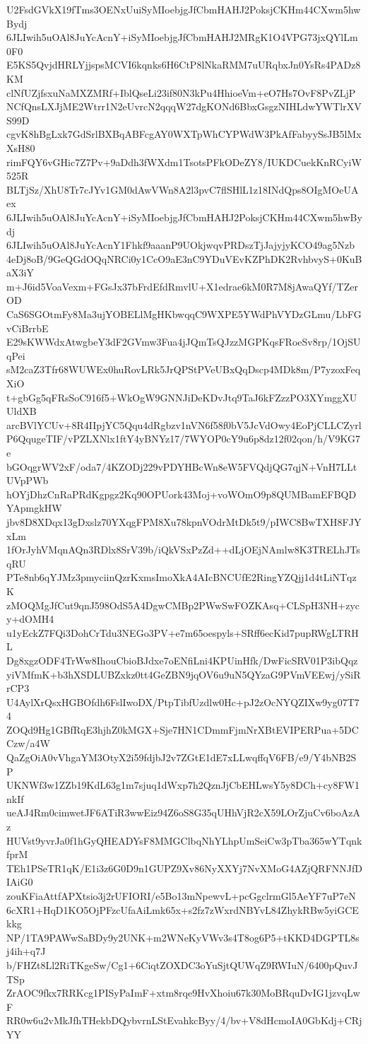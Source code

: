 U2FsdGVkX19fTms3OENxUuiSyMIoebjgJfCbmHAHJ2PoksjCKHm44CXwm5hwBydj
6JLIwih5uOAl8JuYcAcnY+iSyMIoebjgJfCbmHAHJ2MRgK1O4VPG73jxQYlLm0F0
E5KS5QvjdHRLYjjspsMCVI6kqnks6H6CtP8lNkaRMM7uURqbxJn0YsRs4PADz8KM
clNfUZjfsxuNaMXZMRf+IblQseLi23if80N3kPu4HhioeVm+eO7Hs7OvF8PvZLjP
NCfQnsLXJjME2Wtrr1N2eUvrcN2qqqW27dgKONd6BbxGsgzNIHLdwYWTlrXVS99D
cgvK8hBgLxk7GdSrlBXBqABFcgAY0WXTpWhCYPWdW3PkAfFabyySsJB5lMxXsH80
rimFQY6vGHic7Z7Pv+9aDdh3fWXdm1TsotsPFkODeZY8/IUKDCuekKnRCyiW525R
BLTjSz/XhU8Tr7cJYv1GM0dAwVWn8A2l3pvC7flSHlL1z18INdQps8OIgMOeUAex
6JLIwih5uOAl8JuYcAcnY+iSyMIoebjgJfCbmHAHJ2PoksjCKHm44CXwm5hwBydj
6JLIwih5uOAl8JuYcAcnY1Fhkf9aaanP9UOkjwqvPRDszTjJajyjyKCO49ag5Nzb
4eDj8oB/9GeQGdOQqNRCi0y1CcO9aE3nC9YDuVEvKZPhDK2RvhbvyS+0KuBaX3iY
m+J6id5VoaVexm+FGsJx37bFrdEfdRmvlU+X1edrae6kM0R7M8jAwaQYf/TZerOD
CaS6SGOtmFy8Ma3ujYOBELlMgHKbwqqC9WXPE5YWdPhVYDzGLmu/LbFGvCiBrrbE
E29sKWWdxAtwgbeY3dF2GVmw3Fua4jJQmTsQJzzMGPKqsFRoeSv8rp/1OjSUqPei
sM2caZ3Tfr68WUWEx0huRovLRk5JrQPStPVeUBxQqDscp4MDk8m/P7yzoxFeqXiO
t+gbGg5qFRsSoC916f5+WkOgW9GNNJiDeKDvJtq9TaJ6kFZzzPO3XYmggXUUldXB
arcBVlYCUv+8R4IIpjYC5Qqu4dRgbzv1nVN6f58f0bV5JcVdOwy4EoPjCLLCZyrl
P6QqugeTIF/vPZLXNlx1ftY4yBNYz17/7WYOP0cY9u6p8dz12f02qon/h/V9KG7e
bGOqgrWV2xF/oda7/4KZODj229vPDYHBcWn8eW5FVQdjQG7qjN+VnH7LLtUVpPWb
hOYjDhzCnRaPRdKgpgz2Kq90OPUork43Moj+voWOmO9p8QUMBamEFBQDYApmgkHW
jbv8D8XDqx13gDxslz70YXqgFPM8Xu78kpnVOdrMtDk5t9/pIWC8BwTXH8FJYxLm
1fOrJyhVMqnAQn3RDlx8SrV39b/iQkVSxPzZd++dLjOEjNAmlw8K3TRELhJTsqRU
PTe8nb6qYJMz3pmyciinQzrKxmsImoXkA4AIcBNCUfE2RingYZQjj1d4tLiNTqzK
zMOQMgJfCut9qnJ598OdS5A4DgwCMBp2PWwSwFOZKAsq+CLSpH3NH+zycy+dOMH4
u1yEckZ7FQi3DohCrTdu3NEGo3PV+e7m65oespyls+SRff6ecKid7pupRWgLTRHL
Dg8xgzODF4TrWw8IhouCbioBJdxe7oENfiLni4KPUinHfk/DwFicSRV01P3ibQqz
yiVMfmK+b3hXSDLUBZxkz0tt4GeZBN9jqOV6u9uN5QYzaG9PVmVEEwj/ySiRrCP3
U4AylXrQsxHGBOfdh6FslIwoDX/PtpTibfUzdlw0Hc+pJ2zOcNYQZIXw9yg07T74
ZOQd9Hg1GBfRqE3hjhZ0kMGX+Sje7HN1CDmmFjmNrXBtEVIPERPua+5DCCzw/a4W
QaZgOiA0vVhgaYM3OtyX2i59fdjbJ2v7ZGtE1dE7xLLwqffqV6FB/e9/Y4bNB2SP
UKNWf3w1ZZb19KdL63g1m7sjuq1dWxp7h2QznJjCbEHLwsY5y8DCh+cy8FW1nkIf
ueAJ4Rm0cimwetJF6ATiR3wwEiz94Z6oS8G35qUHhVjR2cX59LOrZjuCv6boAzAz
HUVst9yvrJa0f1hGyQHEADYsF8MMGClbqNhYLhpUmSeiCw3pTba365wYTqnkfprM
TEh1PSeTR1qK/E1i3z6G0D9n1GUPZ9Xv86NyXXYj7NvXMoG4AZjQRFNNJfDIAiG0
zouKFiaAttfAPXtsio3j2rUFIORI/e5Bo13mNpewvL+pcGgclrmGl5AeYF7uP7eN
6cXR1+HqD1KO5OjPFzcUfaAiLmk65x+s2fz7zWxrdNBYvL84ZhykRBw5yiGCEkkg
NP/1TA9PAWwSaBDy9y2UNK+m2WNeKyVWv3s4T8og6P5+tKKD4DGPTL8sj4ih+q7J
b/FHZt8Ll2RiTKgeSw/Cg1+6CiqtZOXDC3oYuSjtQUWqZ9RWIuN/6400pQuvJTSp
ZrAOC9fkx7RRKcg1PISyPaImF+xtm8rqe9HvXhoiu67k30MoBRquDvIG1jzvqLwF
RR0w6u2vMkJfhTHekbDQybvrnLStEvahkcByy/4/bv+V8dHcmoIA0GbKdj+CRjYY
